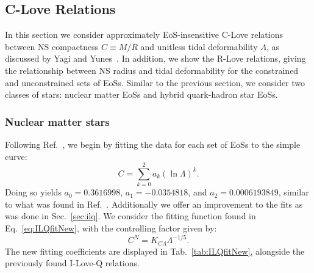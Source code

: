 \documentclass[prd,twocolumn,nofootinbib,superscriptaddress,amsmath,amssymb]{revtex4-1}
\begin{document}
{}

\subsection{C-Love Relations}\label{sec:clove}
In this section we consider approximately EoS-insensitive C-Love relations between NS compactness $C \equiv M/R$ and unitless tidal deformability $\Lambda$, as discussed by Yagi and Yunes~\cite{Yagi:binLove}.
In addition, we show the R-Love relations, giving the relationship between NS radius and tidal deformability for the constrained and unconstrained sets of EoSs.
Similar to the previous section, we consider two classes of stars: nuclear matter EoSs and hybrid quark-hadron star EoSs.

\subsubsection{Nuclear matter stars}\label{sec:clove-nuc}
Following Ref.~\cite{Yagi:binLove}, we begin by fitting the data for each set of EoSs to the simple curve:
\begin{equation}
C = \sum^2_{k=0} a_k (\ln{\Lambda})^k.
\end{equation}
Doing so yields $a_0 = 0.3616998$, $a_1 = -0.0354818$, and $a_2 = 0.0006193849$, similar to what was found in Ref.~\cite{Yagi:binLove}.
Additionally we offer an improvement to the fits as was done in Sec.~\ref{sec:ilq}. 
We consider the fitting function found in Eq.~\ref{eq:ILQfitNew}, with the controlling factor given by:
\begin{equation}
C^N=K_{C\Lambda}\Lambda^{-1/5}.\label{eq:cloveFit}
\end{equation}
The new fitting coefficients are displayed in Tab.~\ref{tab:ILQfitNew}, alongside the previously found I-Love-Q relations.
\end{document}
